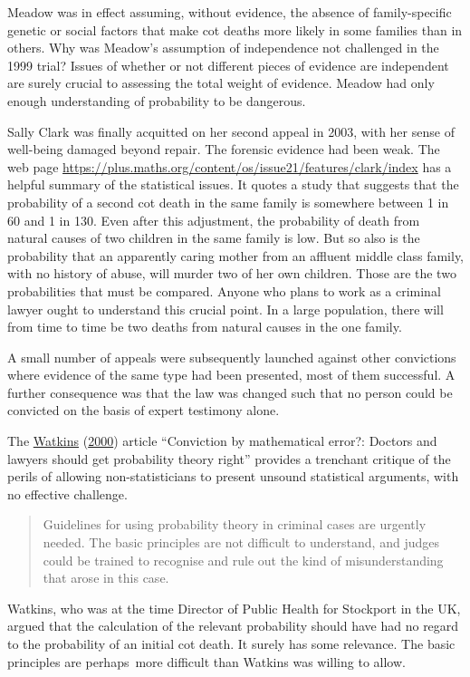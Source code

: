 \documentclass[
  10pt,
  b5paper]{book}
\begin{document}
Meadow was in effect assuming, without evidence, the
absence of family-specific genetic or social factors that
make cot deaths more likely in some families than in others.
Why was Meadow's assumption of independence not challenged
in the 1999 trial? Issues of whether or not different pieces
of evidence are independent are surely crucial to assessing
the total weight of evidence. Meadow had only enough
understanding of probability to be dangerous.

Sally Clark was finally acquitted on her second appeal in
2003, with her sense of well-being damaged beyond repair.
The forensic evidence had been weak. The web page
\url{https://plus.maths.org/content/os/issue21/features/clark/index}
has a helpful summary of the statistical issues. It
quotes a study that suggests that the probability of a
second cot death in the same family is somewhere between 1
in 60 and 1 in 130. Even after this adjustment, the
probability of death from natural causes of two children in
the same family is low. But so also is the probability that
an apparently caring mother from an affluent middle class
family, with no history of abuse, will murder two of her own
children. Those are the two probabilities that must be
compared. Anyone who plans to work as a criminal lawyer
ought to understand this crucial point. In a
large population, there will from time to time be two deaths
from natural causes in the one family.

A small number of appeals were subsequently launched against
other convictions where evidence of the same type had been
presented, most of them successful. A further consequence
was that the law was changed such that no person could be
convicted on the basis of expert testimony alone.

The \protect\hyperlink{ref-watkins2000conviction}{Watkins} (\protect\hyperlink{ref-watkins2000conviction}{2000}) article ``Conviction by mathematical
error?: Doctors and lawyers should get probability theory right''
provides a trenchant critique of the perils of allowing
non-statisticians to present unsound statistical arguments, with
no effective challenge.

\begin{quote}
Guidelines for using probability theory in criminal cases are urgently needed. The basic principles are not difficult to understand, and judges could be trained to recognise and rule out the kind of misunderstanding that arose in this case.
\end{quote}

Watkins, who was at the time Director of Public Health for Stockport
in the UK, argued that the calculation of the relevant probability
should have had no regard to the probability of an initial cot death.
It surely has some relevance. The basic principles are perhaps~more
difficult than Watkins was willing to allow.
\end{document}
